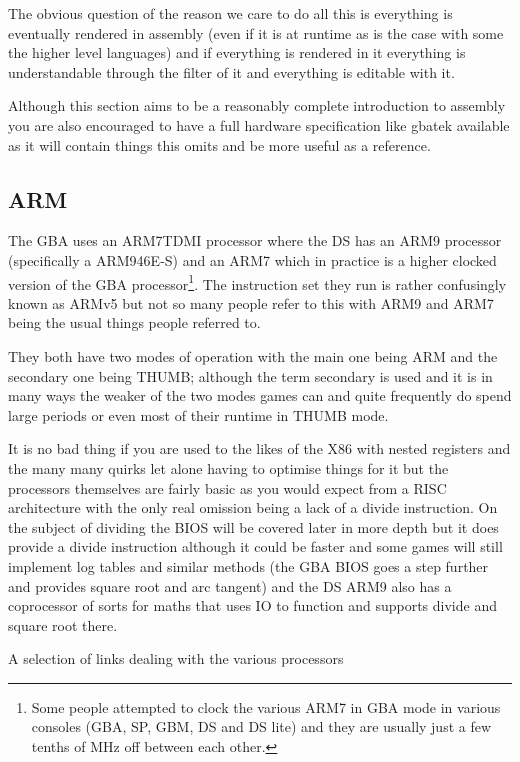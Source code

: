 \documentclass[
]{book}
\begin{document}
The obvious question of the reason we care to do all this is everything is eventually rendered in assembly (even if it is at runtime as is the case with some the higher level languages) and if everything is rendered in it everything is understandable through the filter of it and everything is editable with it.

Although this section aims to be a reasonably complete introduction to assembly you are also encouraged to have a full hardware specification like gbatek available as it will contain things this omits and be more useful as a reference.

\hypertarget{arm}{%
\subsection{ARM}\label{arm}}

The GBA uses an ARM7TDMI processor where the DS has an ARM9 processor (specifically a ARM946E-S) and an ARM7 which in practice is a higher clocked version of the GBA processor\footnote{Some people attempted to clock the various ARM7 in GBA mode in various consoles (GBA, SP, GBM, DS and DS lite) and they are usually just a few tenths of MHz off between each other.}. The instruction set they run is rather confusingly known as ARMv5 but not so many people refer to this with ARM9 and ARM7 being the usual things people referred to.

They both have two modes of operation with the main one being ARM and the secondary one being THUMB; although the term secondary is used and it is in many ways the weaker of the two modes games can and quite frequently do spend large periods or even most of their runtime in THUMB mode.

It is no bad thing if you are used to the likes of the X86 with nested registers and the many many quirks let alone having to optimise things for it but the processors themselves are fairly basic as you would expect from a RISC architecture with the only real omission being a lack of a divide instruction. On the subject of dividing the BIOS will be covered later in more depth but it does provide a divide instruction although it could be faster and some games will still implement log tables and similar methods (the GBA BIOS goes a step further and provides square root and arc tangent) and the DS ARM9 also has a coprocessor of sorts for maths that uses IO to function and supports divide and square root there.

A selection of links dealing with the various processors
\end{document}

